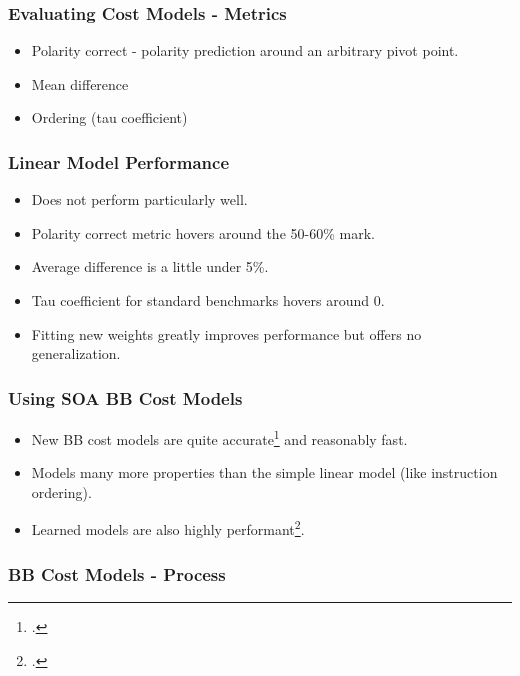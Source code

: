 \documentclass[light]{ucdbeamer}
\begin{document}
\begin{frame}[plain]
\frametitle{Evaluating Cost Models - Metrics}
\begin{itemize}
  \item Polarity correct - polarity prediction around an arbitrary pivot point.
  \item Mean difference
  \item Ordering (tau coefficient)
\end{itemize}
\end{frame}

\begin{frame}[plain]
\frametitle{Linear Model Performance}
\begin{itemize}
  \item Does not perform particularly well.
  \item Polarity correct metric hovers around the 50-60\% mark.
  \item Average difference is a little under 5\%.
  \item Tau coefficient for standard benchmarks hovers around 0.
  \item Fitting new weights greatly improves performance but offers no generalization.
\end{itemize}
\end{frame}

\begin{frame}[plain]
\frametitle{Using SOA BB Cost Models}
\begin{itemize}
  \item New BB cost models are quite accurate\footcite{abel_uica_2022} and reasonably fast.
  \item Models many more properties than the simple linear model (like instruction ordering).
  \item Learned models are also highly performant\footcite{sykora_granite_2022}.
\end{itemize}
\end{frame}

\begin{frame}[plain]
\frametitle{BB Cost Models - Process}


\end{frame}
\end{document}
